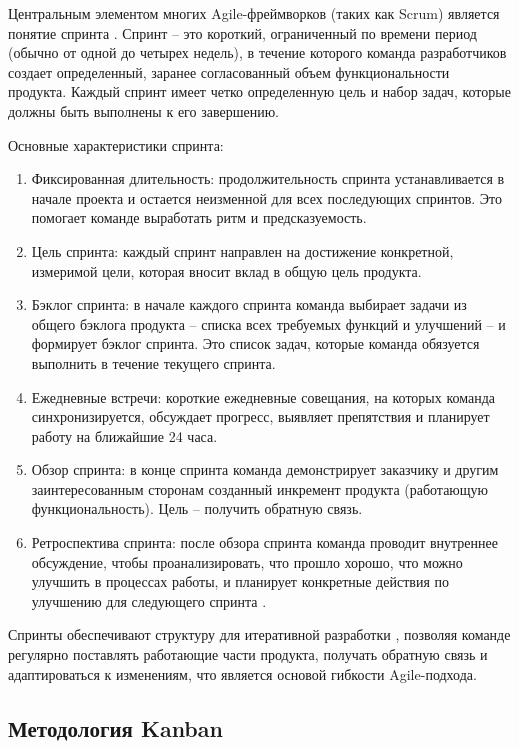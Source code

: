 Центральным элементом многих Agile-фреймворков (таких как Scrum) является понятие спринта \cite{agile1}. Спринт – это короткий, ограниченный по времени период (обычно от одной до четырех недель), в течение которого команда разработчиков создает определенный, заранее согласованный объем функциональности продукта. Каждый спринт имеет четко определенную цель и набор задач, которые должны быть выполнены к его завершению.

Основные характеристики спринта:
\begin{enumerate}
	\item Фиксированная длительность: продолжительность спринта устанавливается в начале проекта и остается неизменной для всех последующих спринтов. Это помогает команде выработать ритм и предсказуемость.
	\item Цель спринта: каждый спринт направлен на достижение конкретной, измеримой цели, которая вносит вклад в общую цель продукта.
	\item Бэклог спринта: в начале каждого спринта команда выбирает задачи из общего бэклога продукта – списка всех требуемых функций и улучшений – и формирует бэклог спринта. Это список задач, которые команда обязуется выполнить в течение текущего спринта.
	\item Ежедневные встречи: короткие ежедневные совещания, на которых команда синхронизируется, обсуждает прогресс, выявляет препятствия и планирует работу на ближайшие 24 часа.
	\item Обзор спринта: в конце спринта команда демонстрирует заказчику и другим заинтересованным сторонам созданный инкремент продукта (работающую функциональность). Цель – получить обратную связь.
	\item Ретроспектива спринта: после обзора спринта команда проводит внутреннее обсуждение, чтобы проанализировать, что прошло хорошо, что можно улучшить в процессах работы, и планирует конкретные действия по улучшению для следующего спринта \cite{agile3}.
\end{enumerate}

Спринты обеспечивают структуру для итеративной разработки \cite{agile5}, позволяя команде регулярно поставлять работающие части продукта, получать обратную связь и адаптироваться к изменениям, что является основой гибкости Agile-подхода.

\subsection{Методология Kanban}

